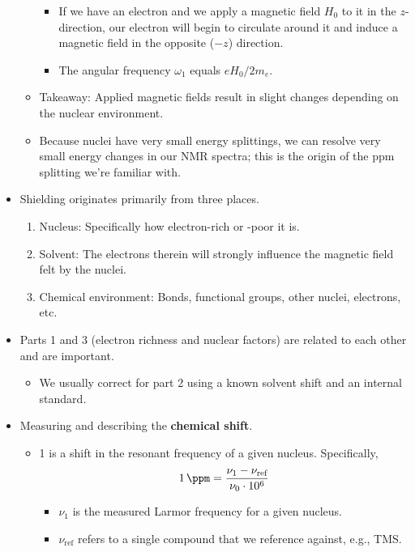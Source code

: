 \documentclass[../notes.tex]{subfiles}
\begin{document}
\begin{itemize}
\begin{itemize}
\begin{itemize}
            \item If we have an electron and we apply a magnetic field $H_0$ to it in the $z$-direction, our electron will begin to circulate around it and induce a magnetic field in the opposite ($-z$) direction.
            \item The angular frequency $\omega_1$ equals $eH_0/2m_e$.
        \end{itemize}
        \item Takeaway: Applied magnetic fields result in slight changes depending on the nuclear environment.
        \item Because nuclei have very small energy splittings, we can resolve very small energy changes in our NMR spectra; this is the origin of the ppm splitting we're familiar with.
    \end{itemize}
    \item Shielding originates primarily from three places.
    \begin{enumerate}
        \item Nucleus: Specifically how electron-rich or -poor it is.
        \item Solvent: The electrons therein will strongly influence the magnetic field felt by the nuclei.
        \item Chemical environment: Bonds, functional groups, other nuclei, electrons, etc.
    \end{enumerate}
    \item Parts 1 and 3 (electron richness and nuclear factors) are related to each other and are important.
    \begin{itemize}
        \item We usually correct for part 2 using a known solvent shift and an internal standard.
    \end{itemize}
    \item Measuring and describing the \textbf{chemical shift}.
    \begin{itemize}
        \item \SI{1}{\ppm} is a shift in the resonant frequency of a given nucleus. Specifically,
        \begin{equation*}
            \SI{1}{\ppm} = \frac{\nu_1-\nu_\text{ref}}{\nu_0\cdot\num{e6}}
        \end{equation*}
        \begin{itemize}
            \item $\nu_1$ is the measured Larmor frequency for a given nucleus.
            \item $\nu_\text{ref}$ refers to a single compound that we reference against, e.g., TMS.

\end{itemize}
\end{itemize}
\end{itemize}
\end{document}
